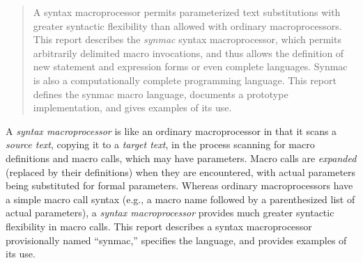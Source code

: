 \documentclass[12pt]{article}
\begin{document}
\maketitle
\begin{abstract}
A syntax macroprocessor permits parameterized text substitutions with greater syntactic flexibility than allowed with ordinary macroprocessors. This report describes the \emph{synmac} syntax macroprocessor, which permits arbitrarily delimited macro invocations, and thus allows the definition of new statement and expression forms or even complete languages.
Synmac is also a computationally complete programming language.
This report defines the synmac macro language, documents a prototype implementation, and gives examples of its use.
\end{abstract}
%
A \emph{syntax macroprocessor} is like an ordinary macroprocessor in that it scans a \emph{source text}, copying it to a \emph{target text}, in the process scanning for macro definitions and macro calls, which may have parameters.
Macro calls are \emph{expanded} (replaced by their definitions) when they are encountered, with actual parameters being substituted for formal parameters.
Whereas ordinary macroprocessors have a simple macro call syntax (e.g., a macro name followed by a parenthesized list of actual parameters), a \emph{syntax macroprocessor} provides much greater syntactic flexibility in macro calls.
This report describes a syntax macroprocessor provisionally named ``synmac,'' specifies the language, and provides examples of its use.
\end{document}
